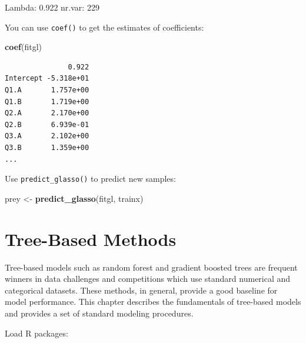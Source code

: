 \documentclass[12pt,]{krantz}
\makeatletter
\newenvironment{Shaded}{\begin{snugshade}}{\end{snugshade}}
\newcommand{\KeywordTok}[1]{\textcolor[rgb]{0.27,0.27,0.27}{\textbf{#1}}}
\newcommand{\NormalTok}[1]{#1}
\newcommand{\StringTok}[1]{\textcolor[rgb]{0.5,0.5,0.5}{#1}}
\newenvironment{kframe}{%
\medskip{}
\setlength{\fboxsep}{.8em}
 \def\at@end@of@kframe{}%
 \ifinner\ifhmode%
  \def\at@end@of@kframe{\end{minipage}}%
  \begin{minipage}{\columnwidth}%
 \fi\fi%
 \def\FrameCommand##1{\hskip\@totalleftmargin \hskip-\fboxsep
 \colorbox{shadecolor}{##1}\hskip-\fboxsep
     \hskip-\linewidth \hskip-\@totalleftmargin \hskip\columnwidth}%
 \MakeFramed {\advance\hsize-\width
   \@totalleftmargin\z@ \linewidth\hsize
   \@setminipage}}%
 {\par\unskip\endMakeFramed%
 \at@end@of@kframe}
\renewenvironment{Shaded}{\begin{kframe}}{\end{kframe}}
\makeatother
\begin{document}
\begin{Shaded}
\begin{Highlighting}[]
\NormalTok{Lambda: 0.922  nr.var: 229}
\end{Highlighting}
\end{Shaded}

You can use \texttt{coef()} to get the estimates of coefficients:

\begin{Shaded}
\begin{Highlighting}[]
\KeywordTok{coef}\NormalTok{(fitgl)}
\end{Highlighting}
\end{Shaded}

\begin{verbatim}
               0.922
Intercept -5.318e+01
Q1.A       1.757e+00
Q1.B       1.719e+00
Q2.A       2.170e+00
Q2.B       6.939e-01
Q3.A       2.102e+00
Q3.B       1.359e+00
...
\end{verbatim}

Use \texttt{predict\_glasso()} to predict new samples:

\begin{Shaded}
\begin{Highlighting}[]
\NormalTok{prey <-}\StringTok{ }\KeywordTok{predict_glasso}\NormalTok{(fitgl, trainx)}
\end{Highlighting}
\end{Shaded}

\hypertarget{treemodel}{%
\chapter{Tree-Based Methods}\label{treemodel}}

Tree-based models such as random forest and gradient boosted trees are frequent winners in data challenges and competitions which use standard numerical and categorical datasets. These methods, in general, provide a good baseline for model performance. This chapter describes the fundamentals of tree-based models and provides a set of standard modeling procedures.

Load R packages:
\end{document}
